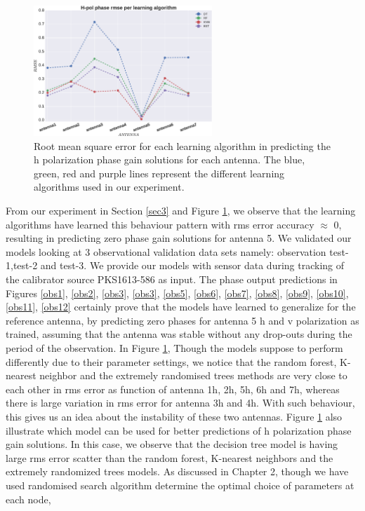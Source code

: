 \begin{figure}[H]
  \centering
    \includegraphics[width=0.6\textwidth]{images/Hpol-phase.eps}
    \caption{Root mean square error for each learning algorithm in predicting the h polarization phase gain solutions for each antenna. The blue, green, red and purple lines represent the different learning algorithms used in our experiment.}
  \label{phrm}
 \end{figure}
From our experiment in Section \ref{sec3} and Figure \ref{phrm}, we observe that the learning algorithms have learned this behaviour pattern with rms error accuracy $\approx$ 0, resulting in predicting zero phase gain solutions for antenna 5. We validated our models looking at 3 observational validation data sets namely: observation test-1,test-2 and test-3. We provide our models with sensor data during tracking of the calibrator source PKS1613-586 as input. The phase output predictions in Figures \ref{obs1}, \ref{obs2}, \ref{obs3}, \ref{obs3}, \ref{obs5}, \ref{obs6}, \ref{obs7}, \ref{obs8}, \ref{obs9}, \ref{obs10}, \ref{obs11}, \ref{obs12}  certainly prove that the models have learned to generalize for the reference antenna, by predicting zero phases for antenna 5 h and v polarization as trained, assuming that the antenna was stable without any drop-outs during the period of the observation. In Figure \ref{phrm}, Though the models suppose to perform differently due to their parameter settings, we notice that the random forest, K-nearest neighbor and the extremely randomised trees methods are very close to each other in rms error as function of antenna 1h, 2h, 5h, 6h and 7h, whereas there is large variation in rms error for antenna 3h and 4h. With such behaviour, this gives us an idea about the instability of these two antennas. Figure \ref{phrm} also illustrate which model can be used for better predictions of h polarization phase gain solutions. In this case, we observe that the decision tree model is having large rms error scatter than the random forest, K-nearest neighbors and the extremely randomized trees models. As discussed in Chapter 2, though we have used randomised search algorithm determine the optimal choice of parameters at each node,
